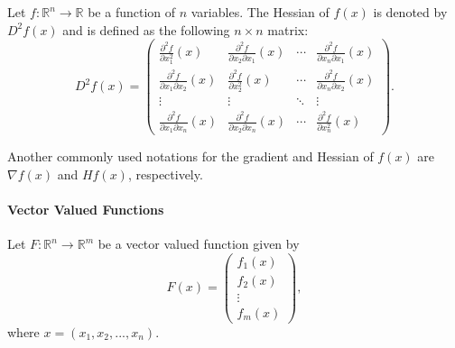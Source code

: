 \begin{definition}
    Let $ f : \mathbb{R}^n \rightarrow \mathbb{R} $ be a function of $ n $
        variables.
    The Hessian of $ f(x) $ is denoted by $ D^2 f(x) $ and is defined as the
        following $ n \times n $ matrix:
    \begin{equation}
        D^2 f(x) =
        \begin{pmatrix}
            \frac{\partial^2 f}{\partial x_1^2} (x) &
                \frac{\partial^2 f}{\partial x_2 \partial x_1} (x) & \cdots &
                \frac{\partial^2 f}{\partial x_n \partial x_1} (x) \\
            \frac{\partial^2 f}{\partial x_1 \partial x_2} (x) &
                \frac{\partial^2 f}{\partial x_2^2} (x) & \cdots &
                \frac{\partial^2 f}{\partial x_n \partial x_2} (x) \\
            \vdots & \vdots & \ddots & \vdots \\
            \frac{\partial^2 f}{\partial x_1 \partial x_n} (x) &
                \frac{\partial^2 f}{\partial x_2 \partial x_n} (x) & \cdots &
                \frac{\partial^2 f}{\partial x_n^2} (x)
        \end{pmatrix}.
        \label{eq:definition:partial-derivative-scalar-valued-function-hessian}
    \end{equation}
\end{definition}
Another commonly used notations for the gradient and Hessian of $ f(x) $ are
    $ \nabla f(x) $ and $ H f(x) $, respectively.

\paragraph{Vector Valued Functions}
Let $ F : \mathbb{R}^n \rightarrow \mathbb{R}^m $ be a vector valued function
    given by
\begin{equation*}
    F(x) =
    \begin{pmatrix}
        f_1 (x) \\
        f_2 (x) \\
        \vdots \\
        f_m (x)
    \end{pmatrix},
\end{equation*}
where $ x = (x_1, x_2, ..., x_n) $.

